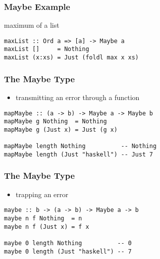 \documentclass[dvipsnames]{beamer}
\theoremstyle{plain}
\begin{document}
\begin{frame}[fragile]
  \frametitle{Maybe Example}

  \begin{exampleblock}{maximum of a list}
    \begin{lstlisting}
maxList :: Ord a => [a] -> Maybe a
maxList []     = Nothing
maxList (x:xs) = Just (foldl max x xs)
    \end{lstlisting}
  \end{exampleblock}
\end{frame}

\begin{frame}[fragile]
  \frametitle{The Maybe Type}

  \begin{itemize}
    \item transmitting an error through a function
  \end{itemize}

  \begin{exampleblock}{}
    \begin{lstlisting}
mapMaybe :: (a -> b) -> Maybe a -> Maybe b
mapMaybe g Nothing  = Nothing
mapMaybe g (Just x) = Just (g x)

mapMaybe length Nothing          -- Nothing
mapMaybe length (Just "haskell") -- Just 7
    \end{lstlisting}
  \end{exampleblock}
\end{frame}

\begin{frame}[fragile]
  \frametitle{The Maybe Type}

  \begin{itemize}
    \item trapping an error
  \end{itemize}

  \begin{exampleblock}{}
    \begin{lstlisting}
maybe :: b -> (a -> b) -> Maybe a -> b
maybe n f Nothing  = n
maybe n f (Just x) = f x

maybe 0 length Nothing          -- 0
maybe 0 length (Just "haskell") -- 7
    \end{lstlisting}
  \end{exampleblock}
\end{frame}
\end{document}
